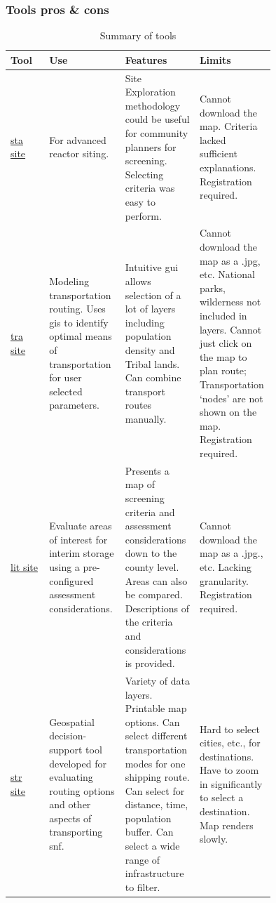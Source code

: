 \documentclass[aspectratio=1610,pdftex,dvipsnames,compress,xcolor={dvipsnames}]{beamer}
\newcommand{\acs}{\acrshort} %
\begin{document}
\begin{frame}[allowframebreaks]
    \frametitle{Tools pros \& cons}
    \scriptsize
        \begin{longtable}{|L{0.14\linewidth}|L{0.25\linewidth}|L{0.23\linewidth}|L{0.13\linewidth}|}
            \caption{Summary of tools}
            \label{tab-tools-1}\\
            \hline
            \textbf{Tool}
            &\textbf{Use}
            &\textbf{Features}
            &\textbf{Limits}
            \\
            \hline


            \href{https://fptz.org/}{\acs{sta} site}
            & For advanced reactor siting. 
            & Site Exploration methodology could be useful for community planners for screening. Selecting criteria was easy to perform.
            & Cannot download the map. Criteria lacked sufficient explanations. Registration required.
            \\
            \hline
        

            \href{https://webtragis.ornl.gov/login}{\acs{tra} site}
            & Modeling transportation routing. Uses \acs{gis} to identify optimal means of transportation for user selected parameters.
            & Intuitive \acs{gui} allows selection of a lot of layers including population density and Tribal lands. Can combine transport routes manually. 
            & Cannot download the map as a .jpg, etc. National parks, wilderness not included in layers. Cannot just click on the map to plan route; Transportation `nodes' are not shown on the map. Registration required.
            \\
            \hline


            \href{https://lite.ornl.gov/#/}{\acs{lit} site}
            & Evaluate areas of interest for interim storage using a pre-configured assessment considerations.
            & Presents a map of screening criteria and assessment considerations down to the county level. Areas can also be compared. Descriptions of the criteria and considerations is provided.  
            & Cannot download the map as a .jpg., etc. Lacking granularity. Registration required. 
            \\
            \hline

         
            \href{https://start.energy.gov/}{\acs{str} site}
            & Geospatial decision-support tool developed for evaluating routing options and other aspects of transporting \acs{snf}.
            & Variety of data layers. Printable map options. Can select different transportation modes for one shipping route. Can select for distance, time, population buffer. Can select a wide range of infrastructure to filter.
            & Hard to select cities, etc., for destinations. Have to zoom in significantly to select a destination. Map renders slowly. 
            \\
            \hline
    \end{longtable}
\end{frame}
\end{document}
